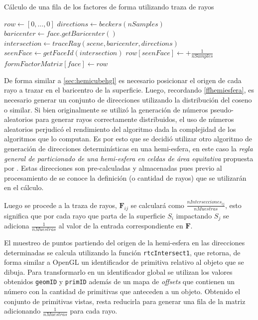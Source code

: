 \begin{algorithm}
	\caption{Cálculo de una fila de los factores de forma utilizando traza de rayos}
	\label{alg:processHemicube}
	\begin{algorithmic}
			\State $row \gets [0,...,0]$
			\State $directions \gets beckers(nSamples)$
			\State $baricenter \gets face.getBaricenter()$
			\State $intersection \gets traceRay(scene, baricenter, directions)$
			\State $seenFace \gets getFaceId(intersection)$
			\State $row[seenFace] \gets + \frac{1}{nSamples}$
			\EndIf
			\EndLoop
			\State $formFactorMatrix[face] \gets  row$
		\EndFunction
	\end{algorithmic}
\end{algorithm}

De forma similar a \ref{sec:hemicubehgl} es necesario posicionar el origen de cada rayo a trazar en el baricentro de la superficie. Luego, recordando \eqref{ffhemiesfera}, es necesario generar un conjunto de direcciones utilizando la distribución del coseno o similar. Si bien originalmente se utilizó la generación de números pseudo-aleatorios para generar rayos correctamente distribuidos, el uso de números aleatorios perjudicó el rendimiento del algoritmo dada la complejidad de los algoritmos que lo computan. Es por esto que se decidió utilizar otro algoritmo de generación de direcciones determinísticas en una hemi-esfera, en este caso la \textit{regla general de particionado de una hemi-esfera en celdas de área equitativa} propuesta por \citeauthor{Becker}. Estas direcciones son pre-calculadas y almacenadas pues previo al procesamiento de se conoce la definición (o cantidad de rayos) que se utilizarán en el cálculo.

Luego se procede a la traza de rayos, $\mathbf{F}_{ij}$ se calculará como $\frac{nIntersecciones_{ij}}{nMuestras}$, esto significa que por cada rayo que parta de la superficie $S_{i}$ impactando $S_{j}$ se adiciona $\frac{1}{nMuestras}$ al valor de la entrada correspondiente en $\mathbf{F}$.

El muestreo de puntos partiendo del origen de la hemi-esfera en las direcciones determinadas se calcula utilizando la función \verb|rtcIntersect1|, que retorna, de forma similar a OpenGL un identificador de primitiva relativo al objeto que se dibuja. Para transformarlo en un identificador global se utilizan los valores obtenidos \verb|geomID| y \verb|primID| además de un mapa de \textit{offsets} que contienen un número con la cantidad de primitivas que anteceden a un objeto. Obtenido el conjunto de primitivas vistas, resta reducirla para generar una fila de la matriz adicionando $\frac{1}{nMuestras}$ para cada rayo.

